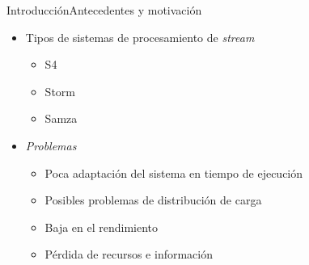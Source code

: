 \begin{frame}{Introducción}{Antecedentes y motivación}
\begin{itemize}
\item Tipos de sistemas de procesamiento de \textsl{stream}
	\begin{itemize}
	\item S4
	\item Storm
	\item Samza
	\end{itemize}
\item \textsl{Problemas}
	\begin{itemize}
	\item Poca adaptaci\'on del sistema en tiempo de ejecución
	\item Posibles problemas de distribución de carga
	\item Baja en el rendimiento
	\item Pérdida de recursos e información
	\end{itemize}
\end{itemize}
\end{frame}

%
